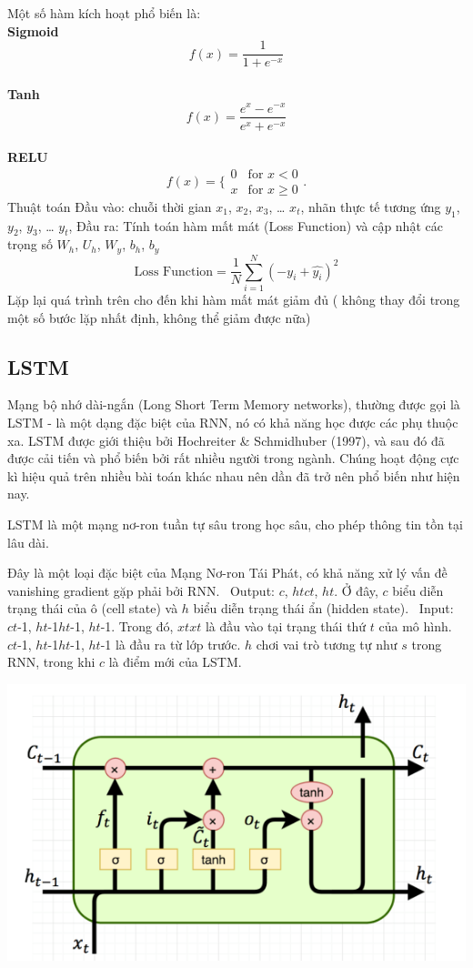 Một số hàm kích hoạt phổ biến là:
\\ \textbf{Sigmoid}
\[f(x)=\frac{1}{1+e^{-x}}\]
\\ \textbf{Tanh}
\[f(x) = \frac{e^x - e^{-x}}{e^x + e^{-x}}\]
\\ \textbf{RELU}
\[f(x)=\{\begin{matrix}
0 & \text{for } x<0 \\
x & \text{for } x\ge0
\end{matrix}.\]
Thuật toán
Đầu vào: chuỗi thời gian \(x_1\), \(x_2\), \(x_3\), … \(x_t\), nhãn thực tế tương ứng \(y_1\), \(y_2\), \(y_3\), … \(y_t\),
Đầu ra: Tính toán hàm mất mát (Loss Function) và cập nhật các trọng số \(W_h\), \(U_h\), \(W_y\), \(b_h\), \(b_y\)
\[\text{Loss Function} = \frac{1}{N} \sum_{i=1}^{N} (-y_i + \hat{y_i})^2\]
Lặp lại quá trình trên cho đến khi hàm mất mát giảm đủ ( không thay đổi trong một số bước lặp nhất định, không thể giảm được nữa)
\subsection{LSTM}
Mạng bộ nhớ dài-ngắn (Long Short Term Memory networks), thường được gọi là LSTM - là một dạng đặc biệt của RNN, nó có khả năng học được các phụ thuộc xa. LSTM được giới thiệu bởi Hochreiter \& Schmidhuber (1997), và sau đó đã được cải tiến và phổ biến bởi rất nhiều người trong ngành. Chúng hoạt động cực kì hiệu quả trên nhiều bài toán khác nhau nên dần đã trở nên phổ biến như hiện nay.
\par
LSTM là một mạng nơ-ron tuần tự sâu trong học sâu, cho phép thông tin tồn tại lâu dài.
\par
Đây là một loại đặc biệt của Mạng Nơ-ron Tái Phát, có khả năng xử lý vấn đề vanishing gradient gặp phải bởi RNN.
    \indent\textbullet\ Output: \(c\), \(htct\), \(ht\). Ở đây, \(c\) biểu diễn trạng thái của ô (cell state) và \(h\) biểu diễn trạng thái ẩn (hidden state).
    \indent\textbullet\ Input: \(ct\)-1, \(ht\)-1\(ht\)-1, \(ht\)-1. Trong đó, \(xtxt\) là đầu vào tại trạng thái thứ \(t\) của mô hình. \(ct\)-1, \(ht\)-1\(ht\)-1, \(ht\)-1 là đầu ra từ lớp trước. \(h\) chơi vai trò tương tự như \(s\) trong RNN, trong khi \(c\) là điểm mới của LSTM.

\begin{minipage}{0.5\textwidth}
\centering
\includegraphics[width=1\textwidth]{resources/chapter-4/lstm-1.png}
\end{minipage}

